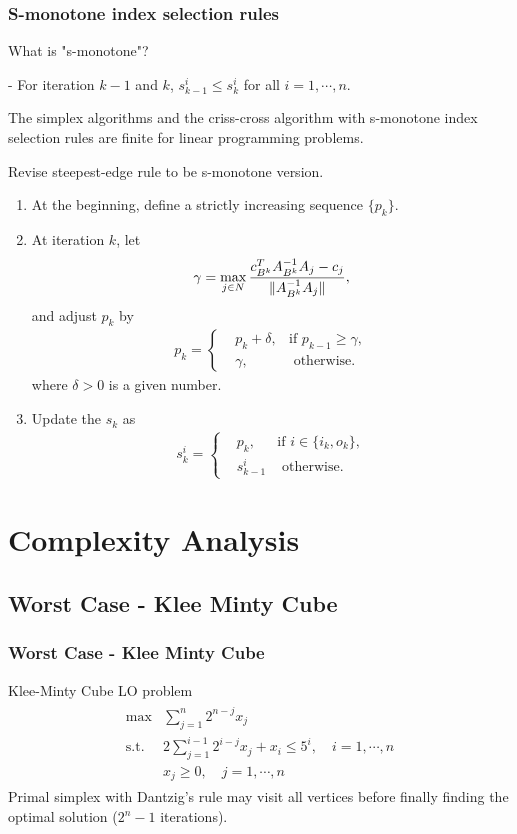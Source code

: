 \documentclass{beamer}
\DeclarePairedDelimiter{\norm}{\lVert}{\rVert}
\begin{document}
\begin{frame}[allowframebreaks]
\frametitle{S-monotone index selection rules}
What is "s-monotone"?

- For iteration $k-1$ and $k$, $s_{k-1}^i \le s_{k}^i$ for all $i= 1,\cdots, n$.
\begin{theorem}
The simplex algorithms and the criss-cross algorithm with s-monotone index selection rules are finite for linear programming problems.
\end{theorem}
\framebreak
Revise steepest-edge rule to be s-monotone version.
\begin{enumerate}
\item At the beginning, define a strictly increasing sequence $\{p_k\}$.
\item At iteration $k$, let
$$
\gamma = \max_{j \in N} \frac{c_{B^k}^TA_{B^k}^{-1}A_j - c_j}{\norm{A_{B^k}^{-1}A_j}},
$$
and adjust $p_k$ by
 \begin{align*}
p_k = \left\{
\begin{aligned}
&p_k + \delta, & \text{if } p_{k-1} \ge \gamma,\\
&\gamma, & \text{ otherwise}. 
\end{aligned}
\right.
\end{align*}
where $\delta > 0$ is a given number. 
\item Update the $s_{k}$ as
\begin{align*}
s_{k}^i = \left\{
\begin{aligned}
&p_k, & \text{if } i \in \{i_k, o_k\},\\
&s_{k-1}^i & \text{ otherwise}. 
\end{aligned}
\right.
\end{align*}
\end{enumerate}
\end{frame}



\section{Complexity Analysis}
\subsection{Worst Case - Klee Minty Cube}
\begin{frame}
\frametitle{Worst Case - Klee Minty Cube}
Klee-Minty Cube LO problem
\begin{align*}
\begin{split}
\max &\sum_{j=1}^n 2^{n-j}x_j \\
\text{s.t. } & 2\sum_{j=1}^{i-1}2^{i-j}x_j + x_i \le 5^i, \quad i=1,\cdots,n\\
			&x_j \ge 0,  \quad j=1,\cdots,n
\end{split}
\end{align*} 
Primal simplex with Dantzig's rule may visit all vertices before finally finding the optimal solution ($2^n - 1$ iterations).
\end{frame}
\end{document}
